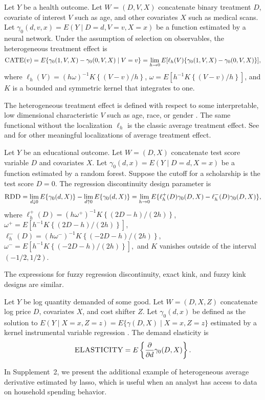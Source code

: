 \begin{example}\label{ex:CATE}
Let $Y$ be a health outcome. Let $W=(D,V,X)$ concatenate binary treatment $D$, covariate of interest $V$ such as age, and other covariates $X$ such as medical scans. Let $\gamma_0(d,v,x)=E(Y\mid D=d,V=v,X=x)$ be a function estimated by a neural network. Under the assumption of selection on observables, the heterogeneous treatment effect is 
$$
\textsc{CATE}(v)=E\{\gamma_0(1,V,X)-\gamma_0(0,V,X)\mid V=v\}=\lim_{h\rightarrow 0}E[\ell_h(V)\{\gamma_0(1,V,X)-\gamma_0(0,V,X)\}],$$ where
$
\ell_h(V)=(h\omega)^{-1}K\left\{(V-v)/h\right\}$, $\omega=E [h^{-1} K\left\{(V-v)/h\right\}]
$, and $K$ is a bounded and symmetric kernel that integrates to one.
\end{example}
The heterogeneous treatment effect is defined with respect to some interpretable, low dimensional characteristic $V$ such as age, race, or gender \cite{abrevaya2015estimating}. The same functional without the localization $\ell_h$ is the classic average treatment effect. See \cite{bibaut2017data} and \cite{colangelo2020double} for other meaningful localizations of average treatment effect.

\begin{example}\label{ex:RDD}
Let $Y$ be an educational outcome. Let $W=(D,X)$ concatenate test score variable $D$ and covariates $X$. Let $\gamma_0(d,x)=E(Y\mid D=d,X=x)$ be a function estimated by a random forest. Suppose the cutoff for a scholarship is the test score $D=0$. The regression discontinuity design parameter is
$$
\textsc{RDD}=\lim_{d\downarrow 0}E\{\gamma_0(d,X)\}-\lim_{d\uparrow 0}E\{\gamma_0(d,X)\}=\lim_{h\rightarrow 0}E\{\ell^{+}_{h}(D)\gamma_0(D,X)-\ell^{-}_{h}(D)\gamma_0(D,X)\},
$$
where
$
\ell^+_h(D)=(h\omega^+)^{-1} K\left\{(2D-h)/(2h)\right\}$, $\omega^+=E \left[h^{-1} K\left\{(2D-h)/(2h)\right\}\right]
$, 
$\ell^-_h(D)=(h\omega^-)^{-1} K\left\{(-2D-h)/(2h)\right\}$, $\omega^-=E \left[h^{-1} K\left\{(-2D-h)/(2h)\right\}\right],$ and $K$ vanishes outside of the interval $(-1/2,1/2)$.
\end{example}
The expressions for fuzzy regression discontinuity, exact kink, and fuzzy kink designs are similar. 

\begin{example}\label{ex:elasticity}
Let $Y$ be log quantity demanded of some good. Let $W=(D,X,Z)$ concatenate log price $D$, covariates $X$, and cost shifter $Z$. Let $\gamma_0(d,x)$ be defined as the solution to $E(Y \mid X=x, Z=z)=E\{\gamma(D,X) \mid X=x, Z=z\}$ estimated by a kernel instrumental variable regression \cite{singh2019kernel}. The demand elasticity is 
$$
\textsc{ELASTICITY}=E\left\{\frac{\partial }{\partial d} \gamma_0(D,X) \right\}.
$$
\end{example}
In Supplement~2, we present the additional example of heterogeneous average derivative estimated by lasso, which is useful when an analyst has access to data on household spending behavior. 

